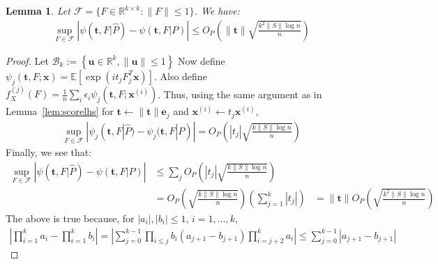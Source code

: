 \documentclass[letterpaper]{article}
\newtheorem{lemma}[theorem]{Lemma}
\newcommand{\bas}[1]{\begin{align*}#1\end{align*}}
\newcommand{\bu}{\pmb{u}}
\newcommand{\bx}{\pmb{x}}
\newcommand{\bt}{\pmb{t}}
\newcommand{\be}{\pmb{e}}
\newcommand{\nt}{\|\bt\|}
\newcommand{\rd}{\color{red}}
\newcommand{\bk}{\color{black}}
\newcommand{\E}{\mathbb{E}}
\newcommand{\norm}[1]{\left\|#1\right\|}
\newcommand{\bb}[1]{\left(#1\right)}
\begin{document}
\begin{lemma}\label{lem:scorerhs}
Let $\mathcal{F}=\{F\in \mathbb{R}^{k\times k}:\|F\|\leq 1\}$. We have:
\bas{
    \sup_{F\in \mathcal{F}}\left|\psi(\bt,F|\hat{P})-\psi(\bt,F|P)\right|\leq  O_P\bb{\nt\sqrt{\frac{k^2\|S\|\log n}{n}}}
}
\end{lemma}
\begin{proof}
Let $\mathcal{B}_{k} := \left\{\bu \in \mathbb{R}^{k}, \norm{\bu}\leq1\right\}$
Now define $\psi_j(\bt,F;\bx)=\E[\exp(it_j F_j^T\bx)]$. Also define $f^{(j)}_X(F)=\frac{1}{n}\sum_i\epsilon_i \psi_j(\bt,F;\bx^{\bb{i}})$. 
Thus, using the same argument as in Lemma~\ref{lem:scorelhs} for $\bt \leftarrow \nt\be_{j}$ and $\bx^{\bb{i}} \leftarrow t_{j}\bx^{\bb{i}}$, 
\bas{\sup_{F\in \mathcal{F}}|\psi_j(\bt,F|\hat{P})-\psi_j(\bt,F|P)|=O_P\bb{|t_{j}|\sqrt{\frac{k\|S\|\log n}{n}}}
}
Finally, we see that:
\bas{
\sup_{F\in \mathcal{F}}\left|\psi(\bt,F|\hat{P})-\psi(\bt,F|P)\right| &\leq \sum_j  O_P\bb{|t_j|\sqrt{\frac{k\|S\|\log n}{n}}}\\
&= O_P\bb{\sqrt{\frac{k\|S\|\log n}{n}}}\bb{\sum_{j=1}^{k}|t_j|} 
&= \nt O_P\bb{\sqrt{\frac{k^2\|S\|\log n}{n}}}
}
The above is true because, for $|a_i|,|b_i|\leq 1$, $i=1,\dots, k$,
\bas{
\left|\prod_{i=1}^k a_i-\prod_{i=1}^k b_i\right|=\left|\sum_{j=0}^{k-1} \prod_{i\leq j}
b_i (a_{j+1}-b_{j+1})\prod_{i=j+2}^k
a_i\right| \leq \sum_{j=0}^{k-1}|a_{j+1}-b_{j+1}| %
}
\end{proof}
\end{document}
